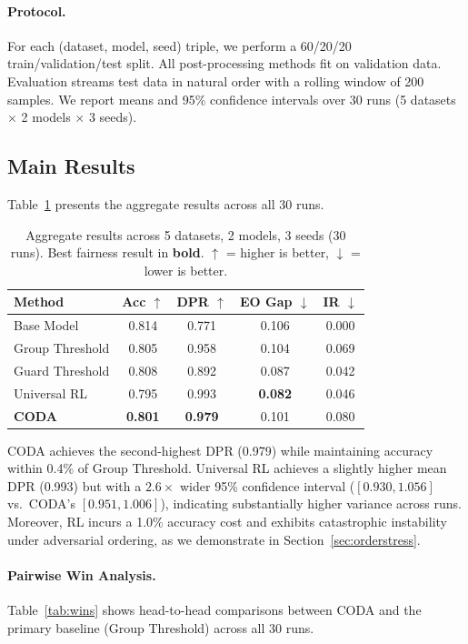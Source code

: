\documentclass[10pt,twocolumn]{article}
\theoremstyle{definition}
\begin{document}
\paragraph{Protocol.} For each (dataset, model, seed) triple, we perform a 60/20/20 train/validation/test split. All post-processing methods fit on validation data. Evaluation streams test data in natural order with a rolling window of 200 samples. We report means and 95\% confidence intervals over 30 runs (5 datasets $\times$ 2 models $\times$ 3 seeds).

\subsection{Main Results}

Table~\ref{tab:main} presents the aggregate results across all 30 runs.

\begin{table}[t]
\centering
\caption{Aggregate results across 5 datasets, 2 models, 3 seeds (30 runs). Best fairness result in \textbf{bold}. $\uparrow$ = higher is better, $\downarrow$ = lower is better.}
\label{tab:main}
\small
\begin{tabular}{@{}lcccc@{}}
\toprule
Method & Acc $\uparrow$ & DPR $\uparrow$ & EO Gap $\downarrow$ & IR $\downarrow$ \\
\midrule
Base Model & 0.814 & 0.771 & 0.106 & 0.000 \\
Group Threshold & 0.805 & 0.958 & 0.104 & 0.069 \\
Guard Threshold & 0.808 & 0.892 & 0.087 & 0.042 \\
Universal RL & 0.795 & 0.993 & \textbf{0.082} & 0.046 \\
\textbf{CODA} & \textbf{0.801} & \textbf{0.979} & 0.101 & 0.080 \\
\bottomrule
\end{tabular}
\end{table}

CODA achieves the second-highest DPR (0.979) while maintaining accuracy within 0.4\% of Group Threshold. Universal RL achieves a slightly higher mean DPR (0.993) but with a $2.6\times$ wider 95\% confidence interval ($[0.930, 1.056]$ vs.\ CODA's $[0.951, 1.006]$), indicating substantially higher variance across runs. Moreover, RL incurs a 1.0\% accuracy cost and exhibits catastrophic instability under adversarial ordering, as we demonstrate in Section~\ref{sec:orderstress}.

\paragraph{Pairwise Win Analysis.} Table~\ref{tab:wins} shows head-to-head comparisons between CODA and the primary baseline (Group Threshold) across all 30 runs.
\end{document}
